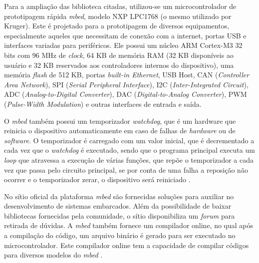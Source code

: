 
Para a ampliação das biblioteca citadas, utilizou-se um microcontrolador de prototipagem rápida \textit{mbed}, modelo NXP LPC1768 \cite{lpc1768:2016} (o mesmo utilizado por Kruger). Este é projetado para a prototipagem de diversos equipamentos, especialmente aqueles que necessitam de conexão com a internet, portas USB e interfaces variadas para periféricos. Ele possui um núcleo ARM Cortex-M3 32 bits com 96 MHz de \textit{clock}, 64 KB de memória RAM (32 KB disponíveis ao usuário e 32 KB reservados aos controladores internos do dispositivo), uma memória \textit{flash} de 512 KB, portas \textit{built-in Ethernet}, USB Host, CAN (\textit{Controller Area Network}), SPI (\textit{Serial Peripheral Interface}), I2C (\textit{Inter-Integrated Circuit}), ADC (\textit{Analog-to-Digital Converter}), DAC (\textit{Digital-to-Analog Converter}), PWM (\textit{Pulse-Width Modulation}) e outras interfaces de entrada e saída.

O \textit{mbed} também possui um temporizador \textit{watchdog}, que é um hardware que reinicia o dispositivo automaticamente em caso de falhas de \textit{hardware} ou de \textit{software}. O temporizador é carregado com um valor inicial, que é decrementado a cada vez que o \textit{watchdog} é executado, sendo que o programa principal executa um \textit{loop} que atravessa a execução de várias funções, que repõe o temporizador a cada vez que passa pelo circuito principal, se por conta de uma falha a reposição não ocorrer e o temporizador zerar, o dispositivo será reiniciado \cite{mbedWhatdog:2016}.

No sítio oficial da plataforma \textit{mbed} são fornecidas soluções para auxiliar no desenvolvimento de sistemas embarcados. Além da possibilidade de baixar bibliotecas fornecidas pela comunidade, o sítio disponibiliza um \textit{forum} para retirada de dúvidas. A \textit{mbed} também fornece um compilador online, no qual após a compilação do código, um arquivo binário é gerado para ser executado no microcontrolador. Este compilador online tem a capacidade de compilar códigos para diversos modelos do \textit{mbed} \cite{mbedCompiler:2016}.

